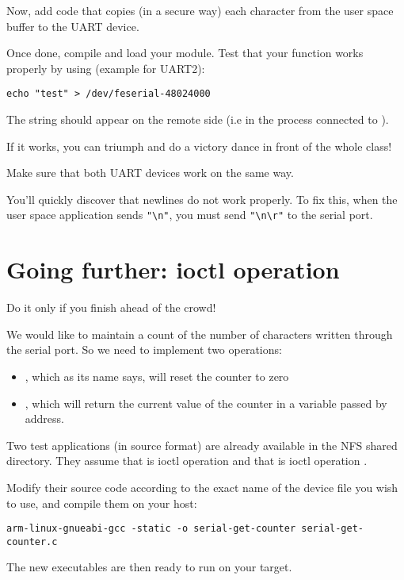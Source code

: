 Now, add code that copies (in a secure way) each character from the
user space buffer to the UART device.

Once done, compile and load your module. Test that your  function
works properly by using (example for UART2):

\begin{verbatim}
echo "test" > /dev/feserial-48024000
\end{verbatim}

The  string should appear on the remote side (i.e in
the  process connected to ).

If it works, you can triumph and do a victory dance in front of the
whole class!

Make sure that both UART devices work on the same way.

You'll quickly discover that newlines do not work properly. To fix
this, when the user space application sends \verb+"\n"+, you must send
\verb+"\n\r"+ to the serial port.

\section{Going further: ioctl operation}

Do it only if you finish ahead of the crowd!

We would like to maintain a count of the number of characters
written through the serial port. So we need to implement two
 operations:
\begin{itemize}

 \item {}, which as its name says, will
   reset the counter to zero

 \item {}, which will return the current
   value of the counter in a variable passed by address.

\end{itemize}

Two test applications (in source format) are already available in the
 NFS shared directory.
They assume that  is ioctl operation 
and that  is ioctl operation .

Modify their source code according to the exact name of the device file
you wish to use, and compile them on your host:

\begin{verbatim}
arm-linux-gnueabi-gcc -static -o serial-get-counter serial-get-counter.c
\end{verbatim}

The new executables are then ready to run on your target.
